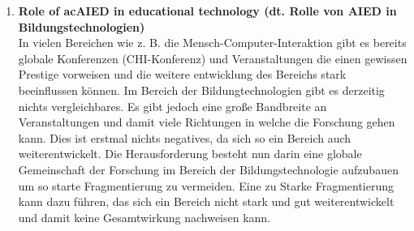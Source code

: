 \begin{enumerate}
    \item \textbf{Role of ac{AIED} in educational technology (dt. Rolle von \ac{AIED} in Bildungstechnologien)} \\
    In vielen Bereichen wie z. B. die Mensch-Computer-Interaktion gibt es bereits globale Konferenzen (CHI-Konferenz) und Veranstaltungen die einen gewissen Prestige vorweisen und die weitere entwicklung des Bereichs stark beeinflussen können.
    Im Bereich der Bildungtechnologien gibt es derzeitig nichts vergleichbares.
    Es gibt jedoch eine große Bandbreite an Veranstaltungen und damit viele Richtungen in welche die Forschung gehen kann.
    Dies ist erstmal nichts negatives, da sich so ein Bereich auch weiterentwickelt.
    Die Herausforderung besteht nun darin eine globale Gemeinschaft der Forschung im Bereich der Bildungstechnologie aufzubauen um so starte Fragmentierung zu vermeiden.
    Eine zu Starke Fragmentierung kann dazu führen, das sich ein Bereich nicht stark und gut weiterentwickelt und damit keine Gesamtwirkung nachweisen kann. \cite[S. 12]{Pinkwart.2016}

\end{enumerate} 
